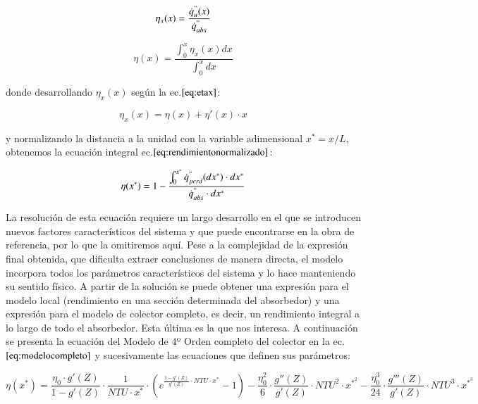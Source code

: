 \begin{equation}
    \eta_{x}(x) = \frac{\dot{q}^{"}_{u}(x)}{\dot{q}^{"}_{abs}} \label{eq:rendimientolocal}
\end{equation}

\begin{equation}
    \eta(x) = \frac{\int_{0}^{x}\eta_{x}(x)dx}{\int_{0}^{x}dx} \label{eq:rendimientointegral}
\end{equation}

donde desarrollando \(\eta_{x}(x)\) según la ec.\(\eqref{eq:etax}\):

\begin{equation}
    \eta_{x}(x) = \eta(x) + \eta'(x)\cdot x  \label{eq:etax}
\end{equation}

y normalizando la distancia a la unidad con la variable adimensional \(x^{*}=x/L\), obtenemos la ecuación integral ec.\(\eqref{eq:rendimientonormalizado}\):

\begin{equation}
    \eta(x^{*}) = 1 - \frac{\int_{0}^{x^{*}} \dot{q}^{"}_{perd}(dx^{*})\cdot dx^{*}}{\dot{q}^{"}_{abs}\cdot dx^{*}} \label{eq:rendimientonormalizado}
\end{equation}

La resolución de esta ecuación requiere un largo desarrollo en el que se introducen nuevos factores característicos del sistema y que puede encontrarse en la obra de referencia, por lo que la omitiremos aquí. Pese a la complejidad de la expresión final obtenida, que dificulta extraer conclusiones de manera directa, el modelo incorpora todos los parámetros característicos del sistema y lo hace manteniendo su sentido físico. A partir de la solución se puede obtener una expresión para el modelo local (rendimiento en una sección determinada del absorbedor) y una expresión para el modelo de colector completo, es decir, un rendimiento integral a lo largo de todo el absorbedor. Esta última es la que nos interesa. A continuación se presenta la ecuación del Modelo de 4º Orden completo del colector en la ec.\(\eqref{eq:modelocompleto}\) y sucesivamente las ecuaciones que definen sus parámetros:

\begin{equation}
    \eta(x^{*}) = \frac{\eta_{0} \cdot g'(Z)}{1-g'(Z)} \cdot \frac{1}{NTU \cdot x^{*}} \cdot \left(e^{\frac{1-g'(Z)}{g'(Z)}\cdot NTU \cdot x^{*}} - 1\right) - \frac{\eta_{0}^2}{6} \cdot \frac{g''(Z)}{g'(Z)} \cdot NTU^{2} \cdot x^{*^{2}} - \frac{\eta_{0}^{3}}{24} \cdot \frac{g'''(Z)}{g'(Z)} \cdot NTU^{3} \cdot x^{*^{3}}
    \label{eq:modelocompleto}
\end{equation}

